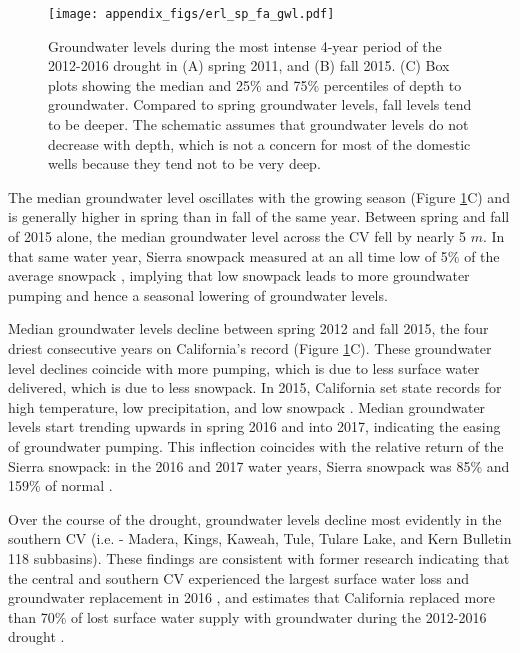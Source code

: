 \begin{figure}[ht]%
	\texttt{[image: appendix\_figs/erl\_sp\_fa\_gwl.pdf]}
	\caption{Groundwater levels during the most intense 4-year period of the 2012-2016 drought in (A) spring 2011, and (B) fall 2015. (C) Box plots showing the median and 25\% and 75\% percentiles of depth to groundwater. Compared to spring groundwater levels, fall levels tend to be deeper. The schematic assumes that groundwater levels do not decrease with depth, which is not a concern for most of the domestic wells because they tend not to be very deep.}
	\label{fig:sp_fall_gwl_2}
\end{figure}

The median groundwater level oscillates with the growing season (Figure \ref{fig:sp_fall_gwl_2}C) and is generally higher in spring than in fall of the same year. Between spring and fall of 2015 alone, the median groundwater level across the CV fell by nearly 5 $m$. In that same water year, Sierra snowpack measured at an all time low of 5\% of the average snowpack \cite{cadwr2017}, implying that low snowpack leads to more groundwater pumping and hence a seasonal lowering of groundwater levels. 

Median groundwater levels decline between spring 2012 and fall 2015, the four driest consecutive years on California's record (Figure \ref{fig:sp_fall_gwl_2}C). These groundwater level declines coincide with more pumping, which is due to less surface water delivered, which is due to less snowpack. In 2015, California set state records for high temperature, low precipitation, and low snowpack \cite{cadwr2017}. Median groundwater levels start trending upwards in spring 2016 and into 2017, indicating the easing of groundwater pumping. This inflection coincides with the relative return of the Sierra snowpack: in the 2016 and 2017 water years, Sierra snowpack was 85\% and 159\% of normal \cite{cadwr2016, cadwr2017}.  

Over the course of the drought, groundwater levels decline most evidently in the southern CV (i.e. - Madera, Kings, Kaweah, Tule, Tulare Lake, and Kern Bulletin 118 subbasins). These findings are consistent with former research indicating that the central and southern CV experienced the largest surface water loss and groundwater replacement in 2016 \cite{Medellin-azuara2016}, and estimates that California replaced more than 70\% of lost surface water supply with groundwater during the 2012-2016 drought \cite{Lund2018}. 


